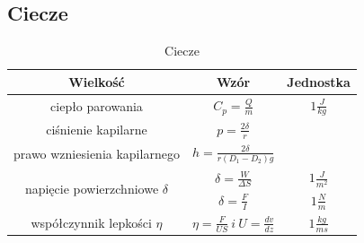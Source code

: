 \documentclass{article}
\begin{document}
\subsection{Ciecze}

\begin{table}[h]
\makegapedcells %
\centering
{}
  \caption[Tabela cieczy]{
    \label{fiztab3}
    Ciecze \vspace{2ex}
  }
\vspace{2ex}
  \centering
 \begin{tabular}{|| c | c | c ||}
	\hline \hline
    \textbf{Wielkość} & \textbf{Wzór} & \textbf{Jednostka} \\[2pt] \hline
ciepło parowania & ${\displaystyle C_{p}=\frac{Q}{m}}$ &  ${\displaystyle 1\frac{J}{kg}}$ \\[2pt] \hline

ciśnienie kapilarne & ${\displaystyle p=\frac{2\delta}{r}}$ &   \\[2pt] \hline

prawo wzniesienia kapilarnego & ${\displaystyle h=\frac{2\delta}{r({D}_{1}-{D}_{2})g}}$ &  \\[2pt] \hline

\multirow{2}{*}{napięcie powierzchniowe $\delta$} & ${\displaystyle \delta=\frac{W}{\Delta S}}$ &  ${\displaystyle 1\frac{J}{{m}^{2}}}$ \\ &  ${\displaystyle \delta=\frac{F}{I}}$ &  ${\displaystyle 1\frac{N}{m}}$ \\[2pt] \hline

współczynnik lepkości $\eta$ & ${\displaystyle \eta=\frac{F}{US}}\ i\ {\displaystyle U=\frac{dv}{dz}}$ &  ${\displaystyle 1\frac{kg}{ms}}$ \\[2pt] \hline\hline
  \end{tabular}  
\end{table}

\printindex


\listoffigures
\end{document}
